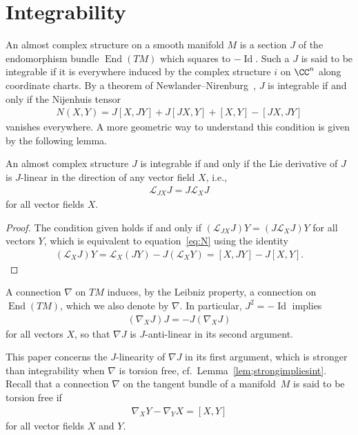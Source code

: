 \section{Integrability} \label{sec;int}

An almost complex structure on a smooth manifold $M$ is a section $J$ of the endomorphism bundle $\operatorname{End}(TM)$ which squares to $-\operatorname{Id}$. Such a $J$ is said to be integrable if it is everywhere induced by the complex structure $i$ on $\CC^n$ along coordinate charts. By a theorem of Newlander--Nirenburg~\cite{NN}, $J$ is integrable if and only if the Nijenhuis tensor
\begin{gather} \label{eq:N}
N(X,Y) = J[X,JY] + J[JX,Y] + [X,Y] - [JX,JY]
\end{gather}
vanishes everywhere. A more geometric way to understand this condition is given by the following lemma.

\begin{lem}An almost complex structure $J$ is integrable if and only if the Lie derivative of $J$ is $J$-linear in the direction of any vector field $X$, i.e.,
\begin{gather*}
\mathcal{L}_{JX} J = J \mathcal{L}_{X} J
\end{gather*}
for all vector fields $X$.
\end{lem}

\begin{proof}The condition given holds if and only if $( \mathcal{L}_{JX} J ) Y= ( J \mathcal{L}_{X} J ) Y$ for all vectors $Y$, which is equivalent to equation~\eqref{eq:N} using the identity
\begin{gather*}
( \mathcal{L}_{X} J ) Y = \mathcal{L}_{X} (JY) - J ( \mathcal{L}_{X} Y ) = [X,JY] - J[X,Y].\tag*{\qed}
\end{gather*} \renewcommand{\qed}{}
\end{proof}

A connection $\nabla$ on $TM$ induces, by the Leibniz property, a connection on $\operatorname{End}(TM)$, which we also denote by $\nabla$. In particular, $J^2=-\operatorname{Id}$ implies
\begin{gather*}
( \nabla_X J) J = -J (\nabla_X J)
\end{gather*}
for all vectors $X$, so that $\nabla J$ is $J$-anti-linear in its second argument.

This paper concerns the $J$-linearity of $\nabla J$ in its first argument, which is stronger than integrability when $\nabla$ is torsion free, cf.\ Lemma~\ref{lem;strongimpliesint}. Recall that a connection $\nabla$ on the tangent bundle of a manifold~$M$ is said to be torsion free if
 \begin{gather*}
 \nabla_X Y - \nabla_Y X = [X,Y]
 \end{gather*}
 for all vector fields $X$ and $Y$.

